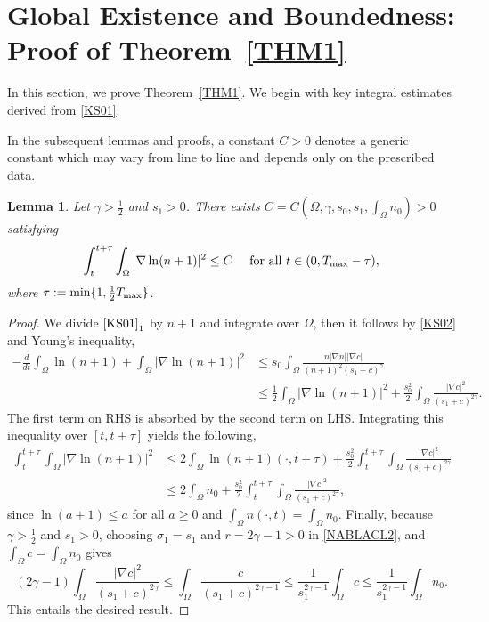 \documentclass{amsart}
\newtheorem{lemma}[defn]{Lemma}
\numberwithin{equation}{section}
\begin{document}
\section{Global Existence and Boundedness: Proof of Theorem~\ref{THM1}}\label{S:Proof_Thm1}

In this section, we prove Theorem~\ref{THM1}. We begin with key integral estimates derived from \eqref{KS01}. 


In the subsequent lemmas and proofs, a constant $C>0$ denotes a generic constant which may vary from line to line and depends only on the prescribed data. 


\begin{lemma}\label{LEMNABLNN}
Let $\gamma>\frac{1}{2}$ and $s_{1}>0$.
There exists $C=C(\Omega, \gamma, s_{0}, s_{1}, \int_{\Omega}n_{0})>0$ satisfying
\[
\int_{t}^{t+\tau}\int_{\Omega} |\nabla \ln(n+1)|^{2}\le C\quad\mbox{ for all }t\in(0,T_{\rm max}-\tau),
\]
where $\tau:=\min\{1,\frac{1}{2}T_{\rm max}\}$.
\end{lemma}
\begin{proof}
We divide $\eqref{KS01}_{1}$ by $n+1$ and integrate over $\Omega$, then it follows by \eqref{KS02} and Young's inequality,  
\[
\begin{aligned}
-\frac{d}{dt}\int_{\Omega}\ln(n+1)+\int_{\Omega} |\nabla \ln(n+1)|^{2}
&\le s_{0}\int_{\Omega} \frac{n |\nabla n| |\nabla c|}{(n+1)^{2}(s_{1}+c)^{\gamma}}
\\&\le \frac{1}{2}\int_{\Omega}|\nabla \ln(n+1)|^{2}+\frac{s_{0}^{2}}{2}\int_{\Omega}\frac{|\nabla c|^{2}}{(s_{1}+c)^{2\gamma}}.
\end{aligned}
\]
The first term on RHS is absorbed by the second term on LHS. 
Integrating this inequality over $[t,t+\tau]$ yields the following, 
\[
\begin{aligned}
\int_{t}^{t+\tau}\int_{\Omega} |\nabla \ln(n+1)|^{2}
&\le 2\int_{\Omega}\ln(n+1)(\cdot,t+\tau)+  \frac{s_{0}^{2}}{2}\int_{t}^{t+\tau}\int_{\Omega}\frac{|\nabla c|^{2}}{(s_{1}+c)^{2\gamma}}
\\&\le 2\int_{\Omega}n_{0}+ \frac{s_{0}^{2}}{2}\int_{t}^{t+\tau}\int_{\Omega}\frac{|\nabla c|^{2}}{(s_{1}+c)^{2\gamma}},
\end{aligned}
\]
since $\ln (a+1) \le a$ for all $a\ge0$ and $\int_{\Omega}n(\cdot, t)=\int_{\Omega}n_{0}$. 
Finally, because $\gamma>\frac{1}{2}$ and $s_{1}>0$, choosing $\sigma_1 = s_1$ and $r=2\gamma -1 >0$ in  \eqref{NABLACL2}, and $\int_{\Omega}c=\int_{\Omega}n_{0}$ gives 
\[
(2\gamma -1)\int_{\Omega}\frac{|\nabla c|^{2}}{(s_{1}+c)^{2\gamma}}
\le \int_{\Omega}\frac{c}{(s_{1}+c)^{2\gamma-1}}
\le \frac{1}{s_{1}^{2\gamma-1}} \int_{\Omega} c 
\le \frac{1}{s_{1}^{2\gamma-1}} \int_{\Omega}n_{0}.
\]
This entails the desired result. 
\end{proof}
\end{document}
